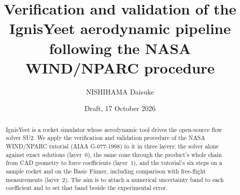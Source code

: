 \documentclass[11pt,a4paper]{article}
\title{Verification and validation of the IgnisYeet aerodynamic pipeline\\
following the NASA WIND/NPARC procedure}
\author{NISHIHAMA Daisuke}
\date{Draft, 17 October 2026}
\begin{document}
\maketitle

\begin{abstract}
IgnisYeet is a rocket simulator whose aerodynamic tool drives the open-source flow solver SU2.
We apply the verification and validation procedure of the NASA WIND/NPARC tutorial (AIAA G-077-1998)
to it in three layers: the solver alone against exact solutions (layer~0), the same cone through the
product's whole chain from CAD geometry to force coefficients (layer~1), and the tutorial's six steps on
a sample rocket and on the Basic Finner, including comparison with free-flight measurements (layer~2).
The aim is to attach a numerical uncertainty band to each coefficient and to set that band beside the
experimental error.


\end{abstract}
\end{document}
